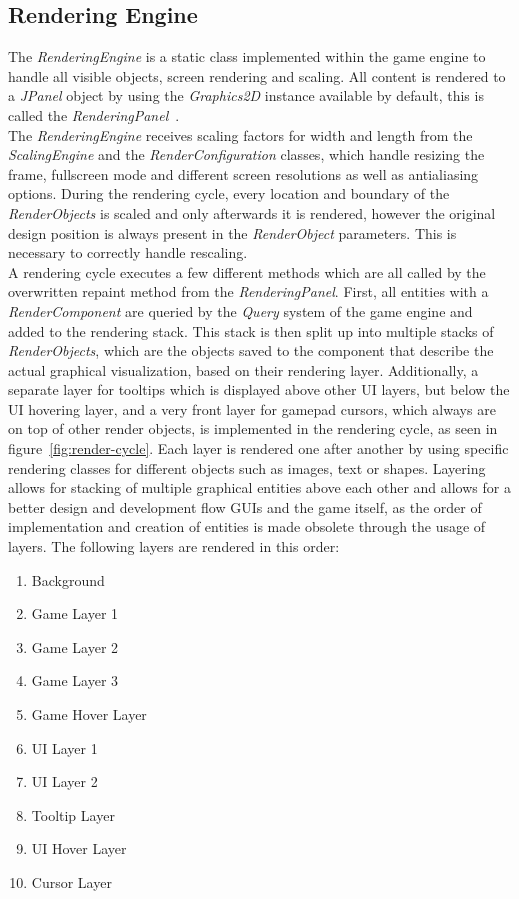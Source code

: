 \subsection{Rendering Engine}\label{subsec:graphics-engine}
The \textit{RenderingEngine} is a static class implemented within the game engine to handle all visible objects, screen rendering and scaling.
All content is rendered to a \textit{JPanel} object by using the \textit{Graphics2D} instance available by default, this is called the \textit{RenderingPanel}~\cite{jpanel,graphics2d}.
\\
The \textit{RenderingEngine} receives scaling factors for width and length from the \textit{ScalingEngine} and the \textit{RenderConfiguration}
classes, which handle resizing the frame,
fullscreen mode and different screen resolutions as well as antialiasing options.
During the rendering cycle, every location and boundary of the \textit{RenderObjects} is scaled and only afterwards it is rendered, however the original design position
is always present in the \textit{RenderObject} parameters.
This is necessary to correctly handle rescaling.
\\
A rendering cycle executes a few different methods which are all called by the overwritten repaint method from the \textit{RenderingPanel}.
First, all entities with a \textit{RenderComponent} are queried by the \textit{Query} system of the game engine and added to the rendering stack.
This stack is then split up into multiple stacks of \textit{RenderObjects}, which are the objects saved to the component that describe the actual
graphical visualization, based on their rendering layer.
Additionally, a separate layer for tooltips which is displayed above other UI layers, but below the UI hovering layer, and a very
front layer for gamepad cursors, which always are on top of other render objects, is implemented in the rendering cycle, as
seen in figure~\ref{fig:render-cycle}.
Each layer is rendered one after another by using specific rendering classes for different objects such as images, text or shapes.
Layering allows for stacking of multiple graphical entities above each other and allows for a better design and development flow GUIs and the game itself,
as the order of implementation and creation of entities is made obsolete through the usage of layers.
The following layers are rendered in this order:
\begin{enumerate}
    \item Background
    \item Game Layer 1
    \item Game Layer 2
    \item Game Layer 3
    \item Game Hover Layer
    \item UI Layer 1
    \item UI Layer 2
    \item Tooltip Layer
    \item UI Hover Layer
    \item Cursor Layer
\end{enumerate}

